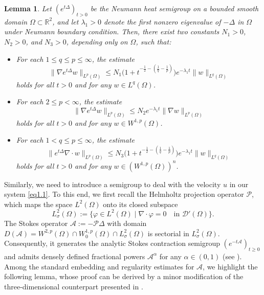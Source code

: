 \documentclass[10pt,a4paper]{amsart}
\numberwithin{equation}{section}
\newtheorem{lemma}[theo]{Lemma}
\begin{document}
\begin{lemma}\label{lem2.6}
Let $(e^{t\Delta})_{t > 0}$ be the Neumann heat semigroup on a bounded smooth domain 
\(\Omega\subset \mathbb{R}^2\), and let $\lambda_1 > 0$ denote the first nonzero 
eigenvalue of $-\Delta$ in $\Omega$ under Neumann boundary condition. 
Then, there exist two constants $N_1>0$, $N_2>0$, and $N_3 > 0$, depending only on 
$\Omega$, such that:
\begin{itemize}
\item[(i)] For each $1 \leq q \leq p \leq \infty$, the estimate
\begin{equation}\label{9.12-6}
\|\nabla e^{t\Delta}  w\|_{L^p(\Omega)} 
\leq N_1 \Big(1 + t^{-\frac{1}{2}-\left(\frac{1}{q} - \frac{1}{p}\right)}\Big) 
e^{-\lambda_1 t} \|w\|_{L^q(\Omega)}
\end{equation}
holds for all $t > 0$ and for any $w \in L^{q}(\Omega)$.

\item[(ii)] For each \(2 \leq p < \infty\), the estimate
\begin{equation}\label{1.18-6}
\|\nabla e^{t\Delta} w\|_{L^p(\Omega)} 
\leq N_2 e^{-\lambda_1 t} \|\nabla w\|_{L^p(\Omega)}
\end{equation}
holds for all $t > 0$ and for any \(w \in W^{1,p}(\Omega)\).

\item[(iii)] For each $1 < q \leq p \leq \infty$, the estimate
\begin{equation}\label{9.12-6-2}
\|e^{t\Delta}\nabla \cdot w\|_{L^p(\Omega)} 
\leq N_3 \Big(1 + t^{-\frac{1}{2} - \left(\frac{1}{q} 
- \frac{1}{p}\right)}\Big) e^{-\lambda_1 t} \|w\|_{L^q(\Omega)}
\end{equation}
holds for all $t > 0$ and for any $w \in (W^{1,p}(\Omega))^n$.
\end{itemize}
\end{lemma}

Similarly, we need to introduce a semigroup to deal with the velocity $u$ 
in our system \eqref{eq1.1}. To this end,  we first recall the Helmholtz projection 
operator \(\mathcal{P}\), which maps the space $L^2(\Omega)$ onto its closed subspace
\[
L_\sigma^2(\Omega) := \{\varphi \in L^2(\Omega) \mid \nabla \cdot \varphi 
= 0 \quad \text{in } \mathcal{D}'(\Omega)\}.
\]
The Stokes operator $\mathcal{A} := -\mathcal{P}\Delta$ with domain 
$D(\mathcal{A}) = W^{2,p}(\Omega) \cap W_0^{1,p}(\Omega) \cap L_\sigma^2(\Omega)$
is sectorial in $L_\sigma^2(\Omega)$. Consequently, it generates the analytic Stokes 
contraction semigroup $(e^{-t\mathcal{A}})_{t\geq0}$ and admits
densely defined fractional powers $\mathcal{A}^\alpha$ for any 
$\alpha \in (0,1)$ (see \cite{Giga-1991, Sohr-2001}). 
Among the standard embedding and regularity estimates for 
\(\mathcal{A}\), we highlight the following lemma, whose proof can be derived by 
a minor modification of the three-dimensional counterpart presented in 
\cite[Lemma 3.1--3.3]{Winkler-2015}.
\end{document}
